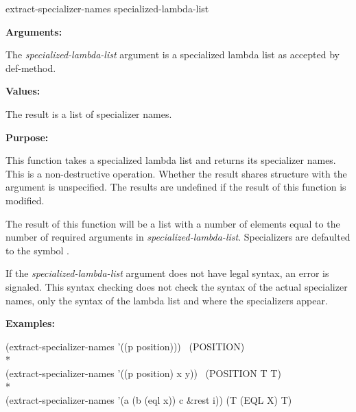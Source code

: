 \begin{defun}[Function]
extract-specializer-names specialized-lambda-list

\textbf{Arguments:}

The \emph{specialized-lambda-list} argument is a specialized lambda list as
accepted by def-method.

\textbf{Values:}

The result is a list of specializer names.

\textbf{Purpose:}

This function takes a specialized lambda list and returns its specializer
names. This is a non-destructive operation. Whether the result shares structure
with the argument is unspecified. The results are undefined if the result of
this function is modified.

The result of this function will be a list with a number of elements equal to
the number of required arguments in \emph{specialized-lambda-list}. Specializers are
defaulted to the symbol .

If the \emph{specialized-lambda-list} argument does not have legal syntax, an
error is signaled. This syntax checking does not check the syntax of the actual
specializer names, only the syntax of the lambda list and where the specializers
appear.

\textbf{Examples:}

\begin{lisp}
(extract-specializer-names '((p position))) \EV\ (POSITION)\\*
\\
(extract-specializer-names '((p position) x y)) \EV\ (POSITION T T)\\*
\\
(extract-specializer-names '(a (b (eql x)) c \&rest i)) \EV (T (EQL X) T)
\end{lisp}
\end{defun}

